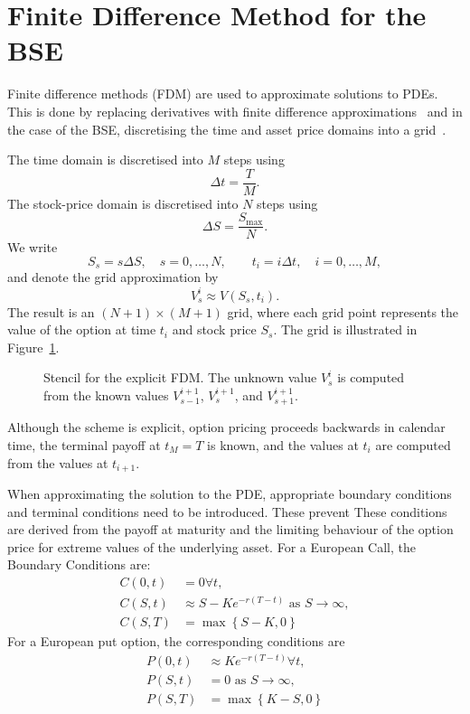 \documentclass[11pt]{report}
\begin{document}
\section{Finite Difference Method for the BSE}
Finite difference methods (FDM) are used to approximate solutions to PDEs. 
This is done by replacing derivatives with finite difference approximations~\cite{alma991006173869708046} 
and in the case of the BSE, discretising the time and asset price 
domains into a grid~\cite{alma991008827533008046}.

The time domain is discretised into $M$ steps using
\begin{equation}
  \Delta t = \frac{T}{M}.
\end{equation}
The stock-price domain is discretised into $N$ steps using
\begin{equation}
  \Delta S = \frac{S_{\max}}{N}.
\end{equation}
We write
\begin{equation}
  S_s = s\Delta S,\quad s=0,\ldots,N,
  \qquad
  t_i = i\Delta t,\quad i=0,\ldots,M,
\end{equation}
and denote the grid approximation by
\begin{equation}
  V_s^i \approx V(S_s,t_i).
\end{equation}
The result is an $(N+1) \times (M+1)$ grid, where each grid point 
represents the value of the option at time $t_i$ and stock 
price $S_s$. The grid is illustrated in Figure~\ref{fig:explicit_stencil}.
\begin{figure}[H]
\centering

\caption{Stencil for the explicit FDM. The unknown value $V_s^i$ is computed from the known values $V_{s-1}^{i+1}$, $V_s^{i+1}$, and $V_{s+1}^{i+1}$.}
\label{fig:explicit_stencil}
\end{figure}
Although the scheme is explicit, option pricing proceeds backwards 
in calendar time, the terminal payoff at $t_M=T$ is known, and the 
values at $t_i$ are computed from the values at $t_{i+1}$.

When approximating the solution to the PDE, appropriate boundary conditions
and terminal conditions need to be introduced. These prevent 
These conditions are derived from the payoff at maturity and the 
limiting behaviour of the option price for extreme values of 
the underlying asset.
For a European Call, the Boundary Conditions are:
\begin{align}
    C\left(0,t\right) &= 0 \forall t, \\
    C\left(S,t\right) &\approx S - Ke^{-r\left(T-t\right)} \text{ as } S\rightarrow \infty, \\
    C\left(S,T\right) &= \max\left\{S-K,0\right\}
    \label{boundaryConditionsCall}
\end{align}
For a European put option, the corresponding conditions are
\begin{align}
      P\left(0,t\right) &\approx Ke^{-r\left(T-t\right)} \forall t, \\
      P\left(S,t\right) &= 0 \text{ as } S\rightarrow \infty, \\
      P\left(S,T\right) &= \max\left\{K-S,0\right\}
    \label{boundaryConditionsPut}
\end{align}
\end{document}
